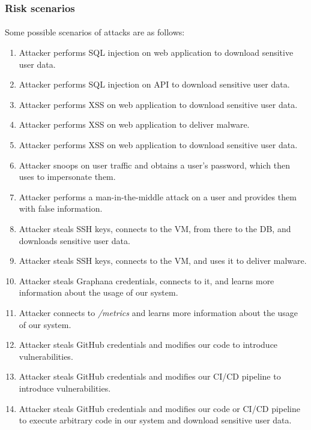 \subsubsection{Risk scenarios}
\paragraph{} Some possible scenarios of attacks are as follows:
\begin{enumerate}
	\item Attacker performs SQL injection on web application to download sensitive user data.
	\item Attacker performs SQL injection on API to download sensitive user data.
	\item Attacker performs XSS on web application to download sensitive user data.
	\item Attacker performs XSS on web application to deliver malware.
	\item Attacker performs XSS on web application to download sensitive user data.
	\item Attacker snoops on user traffic and obtains a user's password, which then uses to impersonate them.
	\item Attacker performs a man-in-the-middle attack on a user and provides them with false information.
	\item Attacker steals SSH keys, connects to the VM, from there to the DB, and downloads sensitive user data.
	\item Attacker steals SSH keys, connects to the VM, and uses it to deliver malware.
	\item Attacker steals Graphana credentials, connects to it, and learns more information about the usage of our system.
	\item Attacker connects to \textit{/metrics} and learns more information about the usage of our system.
	\item Attacker steals GitHub credentials and modifies our code to introduce vulnerabilities.
	\item Attacker steals GitHub credentials and modifies our CI/CD pipeline to introduce vulnerabilities.
	\item Attacker steals GitHub credentials and modifies our code or CI/CD pipeline to execute arbitrary code in our system and download sensitive user data.

\end{enumerate}

